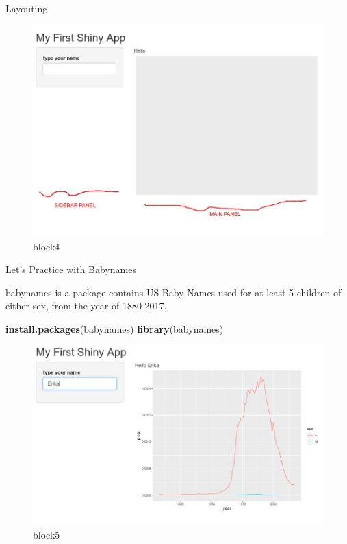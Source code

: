 \documentclass[
  ignorenonframetext,
]{beamer}
\newenvironment{Shaded}{\begin{snugshade}}{\end{snugshade}}
\newcommand{\KeywordTok}[1]{\textcolor[rgb]{0.13,0.29,0.53}{\textbf{#1}}}
\newcommand{\NormalTok}[1]{#1}
\newcommand{\StringTok}[1]{\textcolor[rgb]{0.31,0.60,0.02}{#1}}
\begin{document}
\begin{frame}{Layouting}
\protect\hypertarget{layouting}{}

\begin{figure}
\centering
\includegraphics{images/layout.jpg}
\caption{block4}
\end{figure}

\end{frame}

\begin{frame}[fragile]{Let's Practice with Babynames}
\protect\hypertarget{lets-practice-with-babynames}{}

babynames is a package contains US Baby Names used for at least 5
children of either sex, from the year of 1880-2017.

\begin{Shaded}
\begin{Highlighting}[]
\KeywordTok{install.packages}\NormalTok{(}\StringTok{\textquotesingle{}babynames\textquotesingle{}}\NormalTok{)}
\KeywordTok{library}\NormalTok{(babynames)}
\end{Highlighting}
\end{Shaded}

\begin{figure}
\centering
\includegraphics{images/babynames.jpg}
\caption{block5}
\end{figure}

\end{frame}
\end{document}
